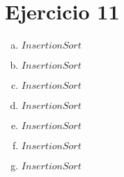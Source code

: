 \documentclass{article}
\begin{document}
    \section*{Ejercicio 11}
    \begin{enumerate}[a)]
        \item $ InsertionSort $
        \item $ InsertionSort $
        \item $ InsertionSort $
        \item $ InsertionSort $
        \item $ InsertionSort $
        \item $ InsertionSort $
        \item $ InsertionSort $
    \end{enumerate}
\end{document}
